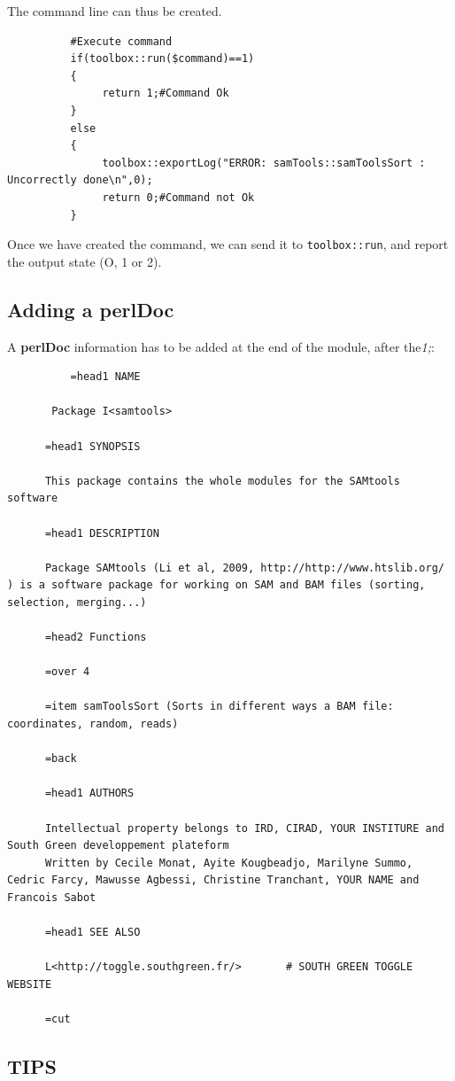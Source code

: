 \documentclass[a4paper,10pt]{report}
\begin{document}
The command line can thus be created.

\begin{lstlisting}
          #Execute command
          if(toolbox::run($command)==1)
          {
               return 1;#Command Ok
          }
          else
          {
               toolbox::exportLog("ERROR: samTools::samToolsSort : Uncorrectly done\n",0);
               return 0;#Command not Ok
          }
\end{lstlisting}

Once we have created the command, we can send it to \texttt{toolbox::run}, and report the output state (O, 1 or 2).

\subsection{Adding a perlDoc}

A \textbf{perlDoc} information has to be added at the end of the module, after the\textit{1;}:

\begin{lstlisting}
          =head1 NAME
	  
	   Package I<samtools> 

	  =head1 SYNOPSIS

	  This package contains the whole modules for the SAMtools software

	  =head1 DESCRIPTION

	  Package SAMtools (Li et al, 2009, http://http://www.htslib.org/ ) is a software package for working on SAM and BAM files (sorting, selection, merging...)

	  =head2 Functions

	  =over 4

	  =item samToolsSort (Sorts in different ways a BAM file: coordinates, random, reads)

	  =back

	  =head1 AUTHORS

	  Intellectual property belongs to IRD, CIRAD, YOUR INSTITURE and South Green developpement plateform 
	  Written by Cecile Monat, Ayite Kougbeadjo, Marilyne Summo, Cedric Farcy, Mawusse Agbessi, Christine Tranchant, YOUR NAME and Francois Sabot

	  =head1 SEE ALSO

	  L<http://toggle.southgreen.fr/>		# SOUTH GREEN TOGGLE WEBSITE

	  =cut
\end{lstlisting}

\subsection{TIPS}
\end{document}
